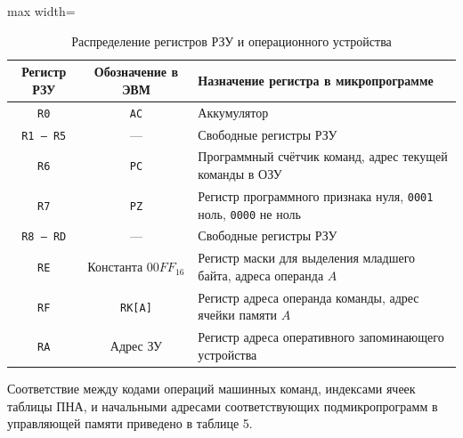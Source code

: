 \documentclass[11pt, a4paper]{article}
\begin{document}
	\begin{table}[h!]
		\centering
		\caption{Распределение регистров РЗУ и операционного устройства}
		\begin{adjustbox}{max width=\textwidth}

		\begin{tabular}{|c|c|l|}
			\hline
			\textbf{Регистр РЗУ} & \textbf{Обозначение в ЭВМ} & \textbf{Назначение регистра в микропрограмме}                                 \\
			\hline
			\texttt{R0}          & \texttt{AC}                & Аккумулятор                                                                   \\
			\texttt{R1 -- R5}    & ---                        & Свободные регистры РЗУ                                                        \\
			\texttt{R6}          & \texttt{PC}                & Программный счётчик команд, адрес текущей команды в ОЗУ                       \\
			\texttt{R7}          & \texttt{PZ}                & Регистр программного признака нуля, \texttt{0001} ноль, \texttt{0000} не ноль \\
			\texttt{R8 -- RD}    & ---                        & Свободные регистры РЗУ                                                        \\
			\texttt{RE}          & Константа $00FF_{16}$      & Регистр маски для выделения младшего байта, адреса операнда $A$               \\
			\texttt{RF}          & \texttt{RK[A]}             & Регистр адреса операнда команды, адрес ячейки памяти $A$                      \\
			\texttt{RA}          & Адрес ЗУ                   & Регистр адреса оперативного запоминающего устройства                          \\
			\hline
		\end{tabular}
	\end{adjustbox}
	\end{table}

Соответствие между кодами операций машинных команд, индексами ячеек таблицы ПНА, и начальными адресами соответствующих подмикропрограмм в управляющей памяти приведено в таблице 5.
\end{document}

